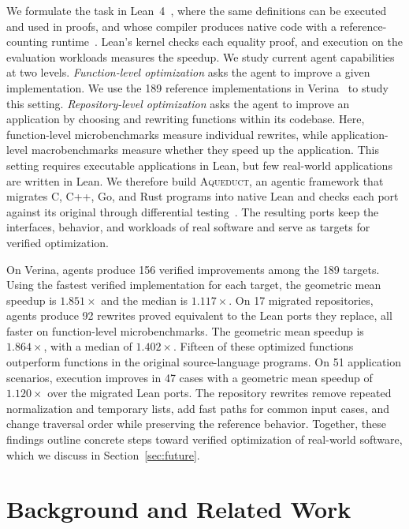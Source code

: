 \documentclass{article}
\newcommand{\aqueduct}{\textsc{Aqueduct}\xspace}
\newcommand{\verina}{Verina\xspace}
\begin{document}
We formulate the task in Lean~4~\citep{moura2021lean4}, where the same definitions can be executed and used in proofs, and whose compiler produces native code with a reference-counting runtime~\citep{ullrich2019counting}.
Lean's kernel checks each equality proof, and execution on the evaluation workloads measures the speedup.
We study current agent capabilities at two levels.
\emph{Function-level optimization} asks the agent to improve a given implementation.
We use the 189 reference implementations in \verina{}~\citep{ye2026verina} to study this setting.
\emph{Repository-level optimization} asks the agent to improve an application by choosing and rewriting functions within its codebase.
Here, function-level microbenchmarks measure individual rewrites, while application-level macrobenchmarks measure whether they speed up the application.
This setting requires executable applications in Lean, but few real-world applications are written in Lean.
We therefore build \aqueduct{}, an agentic framework that migrates C, C++, Go, and Rust programs into native Lean and checks each port against its original through differential testing~\citep{mckeeman1998differential}.
The resulting ports keep the interfaces, behavior, and workloads of real software and serve as targets for verified optimization.

On \verina{}, agents produce 156 verified improvements among the 189 targets.
Using the fastest verified implementation for each target, the geometric mean speedup is $1.851\times$ and the median is $1.117\times$.
On 17 migrated repositories, agents produce 92 rewrites proved equivalent to the Lean ports they replace, all faster on function-level microbenchmarks.
The geometric mean speedup is $1.864\times$, with a median of $1.402\times$.
Fifteen of these optimized functions outperform functions in the original source-language programs.
On 51 application scenarios, execution improves in 47 cases with a geometric mean speedup of $1.120\times$ over the migrated Lean ports.
The repository rewrites remove repeated normalization and temporary lists, add fast paths for common input cases, and change traversal order while preserving the reference behavior.
Together, these findings outline concrete steps toward verified optimization of real-world software, which we discuss in Section~\ref{sec:future}.

\section{Background and Related Work}
\label{sec:related}
\end{document}
